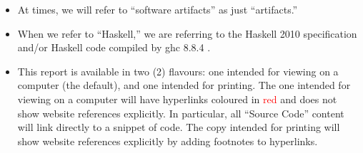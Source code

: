 \begin{itemize}
      \item At times, we will refer to ``software artifacts'' as just
            ``artifacts.''

      \item When we refer to ``Haskell,'' we are referring to the Haskell 2010
            specification \cite{Haskell2010} and/or Haskell code compiled by
            \acs{ghc} 8.8.4 \cite{GHC884}.

      \item This report is available in two (2) flavours: one intended for
            viewing on a computer (the default), and one intended for printing.
            The one intended for viewing on a computer will have hyperlinks
            coloured in \textcolor{red}{red} and does not show website
            references explicitly. In particular, all ``Source Code'' content
            will link directly to a snippet of code. The copy intended for
            printing will show website references explicitly by adding footnotes
            to hyperlinks.

\end{itemize}
